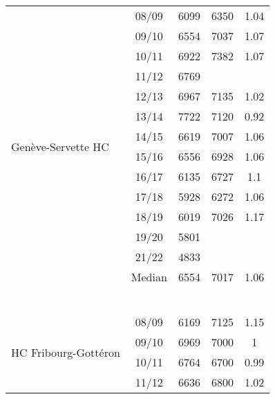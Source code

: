 \begin{longtable}[c]{p{5cm}cccc}
    \multirow[t]{14}{=}{Genève-Servette HC}   & 08/09 & 6099 & 6350 & 1.04 \\ 
                                             & 09/10 & 6554 & 7037 & 1.07 \\ 
                                             & 10/11 & 6922 & 7382 & 1.07 \\ 
                                             & 11/12 & 6769 & ~ & ~ \\ 
                                             & 12/13 & 6967 & 7135 & 1.02 \\ 
                                             & 13/14 & 7722 & 7120 & 0.92 \\ 
                                             & 14/15 & 6619 & 7007 & 1.06 \\ 
                                             & 15/16 & 6556 & 6928 & 1.06 \\ 
                                             & 16/17 & 6135 & 6727 & 1.1 \\ 
                                             & 17/18 & 5928 & 6272 & 1.06 \\ 
                                             & 18/19 & 6019 & 7026 & 1.17 \\ 
                                             & 19/20 & 5801 & ~ & ~ \\ 
                                             & 21/22 & 4833 & ~ & ~ \\ 
                                             \cmidrule{2-5}
                                             & Median & 6554 & 7017 & 1.06 \\
    \cmidrule{1-5} 
     \multicolumn{5}{c}{} \\
    \multicolumn{5}{c}{} \\
    \multicolumn{5}{c}{} \\
    \multicolumn{5}{c}{} \\ 
    \multicolumn{5}{c}{} \\
    \multicolumn{5}{c}{} \\
     \multirow[t]{14}{=}{HC Fribourg-Gottéron}    & 08/09 & 6169 & 7125 & 1.15 \\ 
                                                 & 09/10 & 6969 & 7000 & 1 \\ 
                                                 & 10/11 & 6764 & 6700 & 0.99 \\ 
                                                 & 11/12 & 6636 & 6800 & 1.02 \\ 

\end{longtable}
